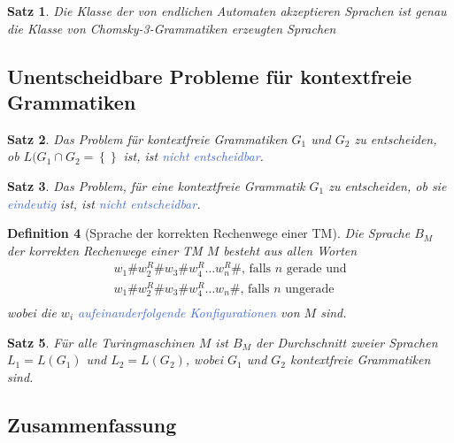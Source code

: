 \documentclass[11pt]{scrartcl}
\newcommand{\tcol}[1]{\textcolor{RoyalBlue}{#1}}
\newcommand{\set}[1]{\left\lbrace #1\right\rbrace}
\theoremstyle{break}
\newtheorem{satz}{Satz}[section]
\newtheorem{defi}[satz]{Definition}
\begin{document}
    \begin{satz}
        Die Klasse der von endlichen Automaten akzeptieren Sprachen ist genau die Klasse von Chomsky-3-Grammatiken erzeugten Sprachen
    \end{satz}


    \subsection{Unentscheidbare Probleme für kontextfreie Grammatiken}
	\label{subsec:unentscheidbare-probleme-für-kontextfreie-grammatikenindex}

    \begin{satz}
        Das Problem für kontextfreie Grammatiken $G_1$ und $G_2$ zu entscheiden, ob $L(G_1\cap G_2=\set{}$ ist, ist \tcol{nicht entscheidbar}.
    \end{satz}

    \begin{satz}
        Das Problem, für eine kontextfreie Grammatik $G_1$ zu entscheiden, ob sie \tcol{eindeutig} ist, ist \tcol{nicht entscheidbar}.
    \end{satz}

    \begin{defi}[Sprache der korrekten Rechenwege einer TM]
        Die Sprache $B_M$ der korrekten Rechenwege einer TM $M$ besteht aus allen Worten
        \begin{gather*}
            w_1\#w_2^R\#w_3\#w_4^R\dots w_n^R\#\text{, falls $n$ gerade und}\\
            w_1\#w_2^R\#w_3\#w_4^R\dots w_n\#\text{, falls $n$ ungerade}\\
        \end{gather*}
        wobei die $w_i$ \tcol{aufeinanderfolgende Konfigurationen} von $M$ sind.
    \end{defi}

    \begin{satz}
        Für alle Turingmaschinen $M$ ist $B_M$ der Durchschnitt zweier Sprachen $L_1=L(G_1)$ und $L_2=L(G_2)$, wobei $G_1$ und $G_2$ kontextfreie Grammatiken sind.
    \end{satz}


    \subsection{Zusammenfassung}
	\label{subsec:zusammenfassung}
\end{document}
